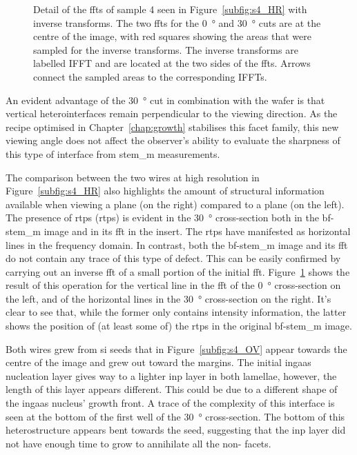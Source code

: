 \begin{figure}
    \caption[Detail of the \acs{fft}s of sample 4 with inverse transforms.]{Detail of the \acs{fft}s of sample 4 seen in Figure~\ref{subfig:s4_HR} with inverse transforms. The two \acs{fft}s for the \qty{0}{\degree} and \qty{30}{\degree} cuts are at the centre of the image, with red squares showing the areas that were sampled for the inverse transforms. The inverse transforms are labelled IFFT and are located at the two sides of the \acs{fft}s. Arrows connect the sampled areas to the corresponding IFFTs.}
    \label{fig:FFT_analysis}
\end{figure}

An evident advantage of the \qty{30}{\degree} cut in combination with the  wafer is that vertical  heterointerfaces remain perpendicular to the viewing direction. As the recipe optimised in Chapter~\ref{chap:growth} stabilises this facet family, this new viewing angle does not affect the observer's ability to evaluate the sharpness of this type of interface from \acs{stem_m} measurements.

The comparison between the two wires at high resolution in Figure~\ref{subfig:s4_HR} also highlights the amount of structural information available when viewing a  plane (on the right) compared to a  plane (on the left). The presence of \acl{rtp}s (\acs{rtp}s) is evident in the \qty{30}{\degree} cross-section both in the \acs{bf}-\acs{stem_m} image and in its \acf{fft} in the insert. The \acs{rtp}s have manifested as horizontal lines in the frequency domain. In contrast, both the  \acs{bf}-\acs{stem_m} image and its \acf{fft} do not contain any trace of this type of defect. This can be easily confirmed by carrying out an inverse \acs{fft} of a small portion of the initial \acs{fft}. Figure~\ref{fig:FFT_analysis} shows the result of this operation for the vertical line in the \acs{fft} of the \qty{0}{\degree} cross-section on the left, and of the horizontal lines in the \qty{30}{\degree} cross-section on the right. It's clear to see that, while the former only contains intensity information, the latter shows the position of (at least some of) the \acs{rtp}s in the original \acs{bf}-\acs{stem_m} image.

Both wires grew from \acl{si} seeds that in Figure~\ref{subfig:s4_OV} appear towards the centre of the image and grew out toward the margins. The initial \acs{ingaas} nucleation layer gives way to a lighter \acs{inp} layer in both lamellae, however, the length of this layer appears different. This could be due to a different shape of the \acs{ingaas} nucleus' growth front. A trace of the complexity of this interface is seen at the bottom of the first well of the \qty{30}{\degree} cross-section. The bottom of this heterostructure appears bent towards the seed, suggesting that the \acs{inp} layer did not have enough time to grow to annihilate all the non- facets.

